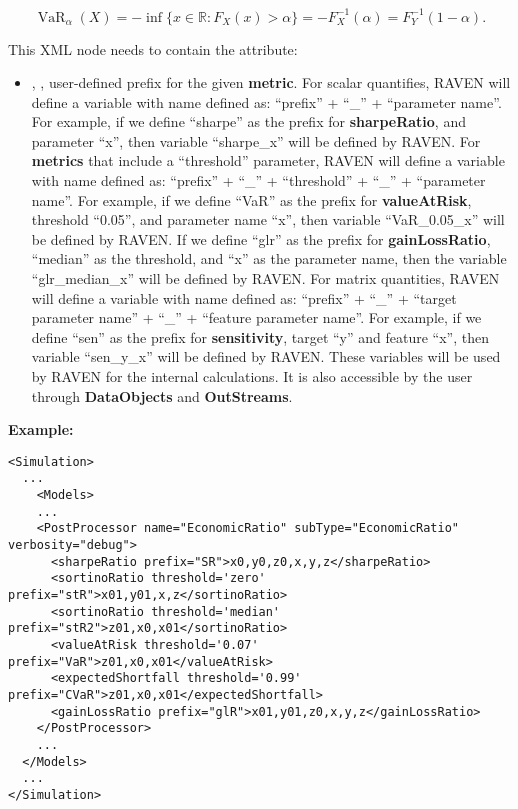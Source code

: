 \begin{itemize}
\begin{itemize}
  \begin{equation}
    \operatorname{VaR}_\alpha(X)=-\inf\big\{x\in\mathbb{R}:F_X(x)>\alpha\big\} = -F^{-1}_X(\alpha) = F^{-1}_Y(1-\alpha).
  \end{equation}
  \end{itemize}
  This XML node needs to contain the attribute:
  \begin{itemize}
    \itemsep0em
    \item {}, , user-defined prefix for the given \textbf{metric}.
      For scalar quantifies, RAVEN will define a variable with name defined as:  ``prefix'' + ``\_'' + ``parameter name''.
      For example, if we define ``sharpe'' as the prefix for \textbf{sharpeRatio}, and parameter ``x'', then variable
      ``sharpe\_x'' will be defined by RAVEN. For \textbf{metrics} that include a ``threshold'' parameter,
      RAVEN will define a variable with name defined as: ``prefix'' + ``\_'' + ``threshold'' + ``\_'' + ``parameter name''.
      For example, if we define ``VaR'' as the prefix for \textbf{valueAtRisk}, threshold ``0.05'', and parameter name ``x'',
      then variable ``VaR\_0.05\_x'' will be defined by RAVEN. If we define ``glr'' as the prefix for \textbf{gainLossRatio},
      ``median'' as the threshold, and ``x'' as the parameter name, then the variable ``glr\_median\_x''
      will be defined by RAVEN.
      For matrix quantities, RAVEN will define a variable with name defined as: ``prefix'' + ``\_'' + ``target parameter name'' + ``\_'' + ``feature parameter name''.
      For example, if we define ``sen'' as the prefix for \textbf{sensitivity}, target ``y'' and feature ``x'', then
      variable ``sen\_y\_x'' will be defined by RAVEN.
      \nb These variables will be used by RAVEN for the internal calculations. It is also accessible by the user through
      \textbf{DataObjects} and \textbf{OutStreams}.
  \end{itemize}

\end{itemize}


\textbf{Example:}
\begin{lstlisting}[style=XML,morekeywords={name,subType,class,type,steps}]
<Simulation>
  ...
    <Models>
    ...
    <PostProcessor name="EconomicRatio" subType="EconomicRatio" verbosity="debug">
      <sharpeRatio prefix="SR">x0,y0,z0,x,y,z</sharpeRatio>
      <sortinoRatio threshold='zero' prefix="stR">x01,y01,x,z</sortinoRatio>
      <sortinoRatio threshold='median' prefix="stR2">z01,x0,x01</sortinoRatio>
      <valueAtRisk threshold='0.07' prefix="VaR">z01,x0,x01</valueAtRisk>
      <expectedShortfall threshold='0.99' prefix="CVaR">z01,x0,x01</expectedShortfall>
      <gainLossRatio prefix="glR">x01,y01,z0,x,y,z</gainLossRatio>
    </PostProcessor>
    ...
  </Models>
  ...
</Simulation>
\end{lstlisting}
